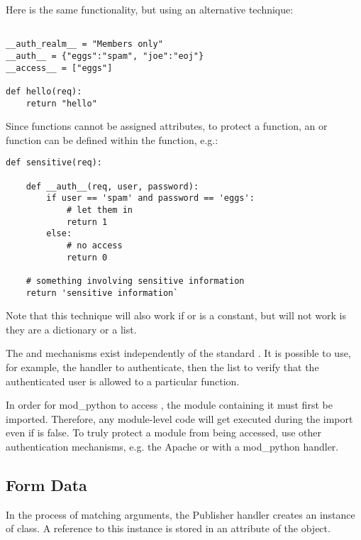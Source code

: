 Here is the same functionality, but using an alternative technique:

\begin{verbatim}

__auth_realm__ = "Members only"
__auth__ = {"eggs":"spam", "joe":"eoj"}
__access__ = ["eggs"]

def hello(req):
    return "hello"

\end{verbatim}

Since functions cannot be assigned attributes, to protect a function,
an  or  function can be defined within
the function, e.g.:

\begin{verbatim}
def sensitive(req):

    def __auth__(req, user, password):
        if user == 'spam' and password == 'eggs':
            # let them in
            return 1
        else:
            # no access
            return 0

    # something involving sensitive information
    return 'sensitive information`
\end{verbatim}

Note that this technique will also work if  or
 is a constant, but will not work is they are
a dictionary or a list. 

The  and  mechanisms exist
independently of the standard 
. It
is possible to use, for example, the handler to authenticate, then the
 list to verify that the authenticated user is
allowed to a particular function. 

 In order for mod_python to access ,
the module containing it must first be imported. Therefore, any
module-level code will get executed during the import even if
 is false.  To truly protect a module from
being accessed, use other authentication mechanisms, e.g. the Apache
 or with a mod_python  handler.

\subsection{Form Data}

In the process of matching arguments, the Publisher handler creates an
instance of 
class. A reference to this instance is stored in an attribute 
of the  object.

